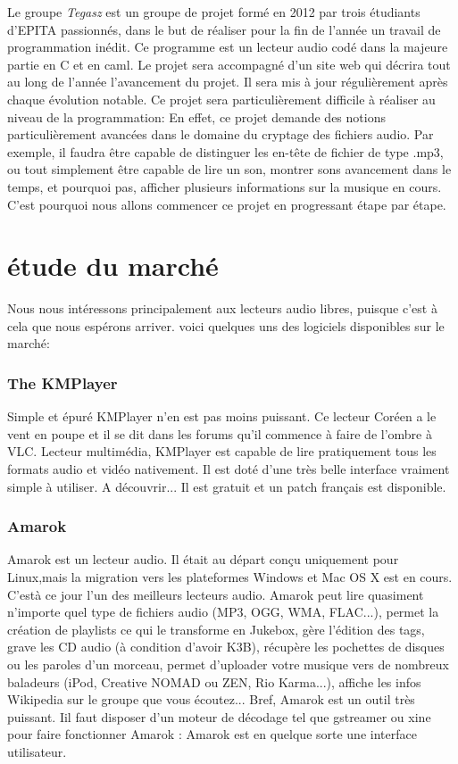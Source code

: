 \documentclass{report}
\begin{document}
Le groupe\textit{ Tegasz} est un groupe de projet formé en 2012 par trois  étudiants d'EPITA passionnés, dans le but de réaliser pour la fin de l'année un travail de programmation inédit. Ce programme est un lecteur audio codé dans la majeure partie en C et en caml. Le projet sera accompagné d'un site web qui décrira tout au long de l'année l'avancement du projet. Il sera mis à  jour régulièrement après chaque évolution notable.
Ce projet sera particulièrement difficile à  réaliser au niveau de la programmation:
En effet, ce projet demande des notions particulièrement avancées dans le domaine du cryptage des fichiers audio. Par exemple, il faudra être capable de distinguer les en-tête de fichier de type .mp3, ou tout simplement être capable de lire un son, montrer sons avancement dans le temps, et pourquoi pas, afficher plusieurs informations sur la musique en cours.
 C'est pourquoi nous allons commencer ce projet en progressant étape par étape.

\newpage

	\section{étude du marché}
Nous nous intéressons principalement aux lecteurs audio libres, puisque c'est à  cela que nous espérons arriver. voici quelques uns des logiciels disponibles sur le marché:

			\subsubsection{The KMPlayer}

Simple et épuré KMPlayer n'en est pas moins puissant. Ce lecteur Coréen a le vent en poupe et il se dit dans les forums qu'il commence à faire de l'ombre à VLC. Lecteur multimédia, KMPlayer est capable de lire pratiquement tous les formats audio et vidéo nativement. Il est doté d'une très belle interface vraiment simple à  utiliser. A découvrir... Il est gratuit et un patch français est disponible.

\subsubsection{Amarok}

Amarok est un lecteur audio. Il était au départ conçu uniquement pour Linux,mais la migration vers les plateformes Windows et Mac OS X est en cours. C'est\`a ce jour l'un des meilleurs lecteurs audio. 
 Amarok peut lire quasiment n'importe quel type de fichiers audio (MP3, OGG, WMA, FLAC...), permet la création de playlists ce qui le transforme en Jukebox, gère l'édition des tags, grave les CD audio (à condition d'avoir K3B), récupère les pochettes de disques ou les paroles d'un morceau, permet d'uploader votre musique vers de nombreux baladeurs (iPod, Creative NOMAD ou ZEN, Rio Karma...), affiche les infos Wikipedia sur le groupe que vous écoutez... Bref, Amarok est un outil très puissant.
Iil faut disposer d'un moteur de décodage tel que gstreamer ou xine pour faire fonctionner Amarok : Amarok est en quelque sorte une interface utilisateur. 
\end{document}
